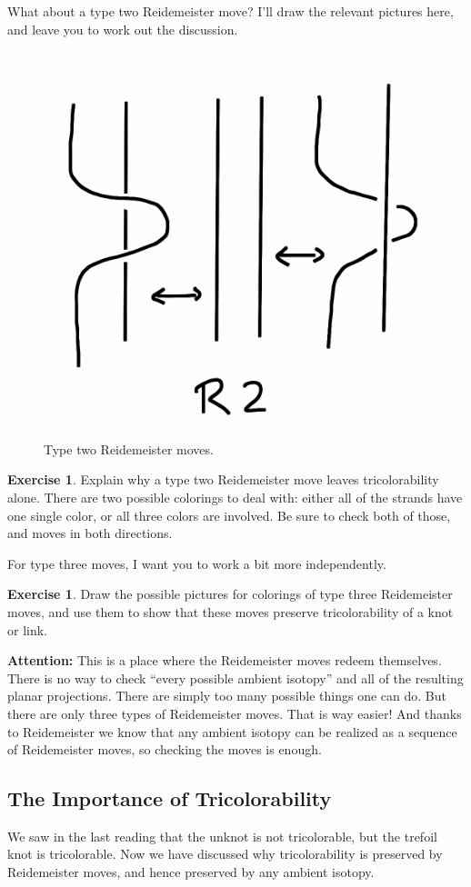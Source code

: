 \documentclass[12pt,letterpaper]{article}
\theoremstyle{definition}
\newtheorem{exercise}[question]{Exercise}
\begin{document}
What about a type two Reidemeister move?
I'll draw the relevant pictures here, and leave you to work out the discussion.

\begin{figure}[h!]
    \centering
    \includegraphics[width=.3\textwidth]{rgp08pics/r2.png}
    \caption{Type two Reidemeister moves.}
\end{figure}


\begin{exercise}
Explain why a type two Reidemeister move leaves tricolorability alone.
There are two possible colorings to deal with: either all of the strands have one single color, or all three colors are involved.
Be sure to check both of those, and moves in both directions.
\end{exercise}

For type three moves, I want you to work a bit more independently.

\begin{exercise}
Draw the possible pictures for colorings of type three Reidemeister moves, and use them to show that these moves preserve tricolorability of a knot or link.
\end{exercise}

\textbf{Attention:} This is a place where the Reidemeister moves redeem themselves.
There is no way to check ``every possible ambient isotopy'' and all of the resulting planar projections.
There are simply too many possible things one can do.
But there are only three types of Reidemeister moves.
That is way easier!
And thanks to Reidemeister we know that any ambient isotopy can be realized as a sequence of Reidemeister moves, so checking the moves is enough.

\subsection*{The Importance of Tricolorability}

We saw in the last reading that the unknot is not tricolorable, but the trefoil knot is tricolorable.
Now we have discussed why tricolorability is preserved by Reidemeister moves, and hence preserved by any ambient isotopy.
\end{document}
